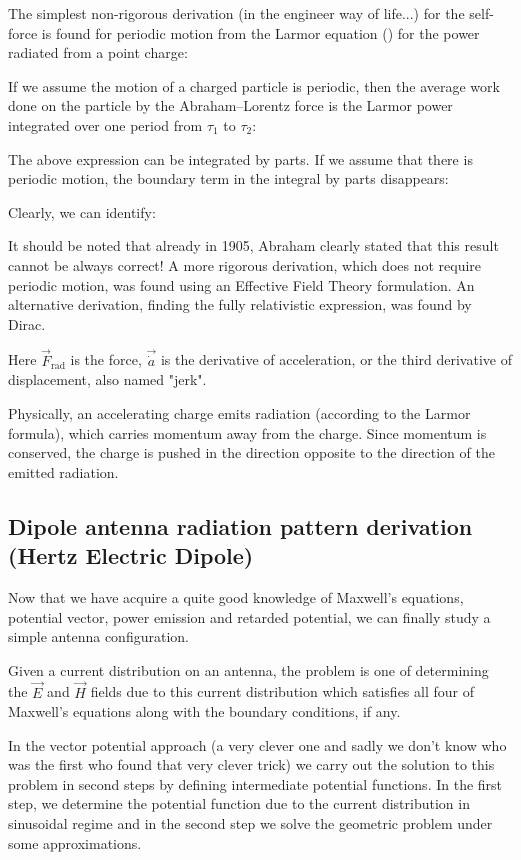 	The simplest non-rigorous derivation (in the engineer way of life...) for the self-force is found for periodic motion from the Larmor equation () for the power radiated from a point charge:
	
	If we assume the motion of a charged particle is periodic, then the average work done on the particle by the Abraham–Lorentz force is the  Larmor power integrated over one period from $\tau _{1}$ to $\tau _{2}$:
	
	The above expression can be integrated by parts. If we assume that there is periodic motion, the boundary term in the integral by parts disappears:
	
	Clearly, we can identify:
	
	It should be noted that already in 1905, Abraham clearly stated that this result cannot be always correct! A more rigorous derivation, which does not require periodic motion, was found using an Effective Field Theory formulation. An alternative derivation, finding the fully relativistic expression, was found by Dirac.
	
	Here $\vec{F}_\mathrm{rad}$ is the force, $\vec{\dot{a}}$ is the derivative of acceleration, or the third derivative of displacement, also named "jerk".
	
	Physically, an accelerating charge emits radiation (according to the Larmor formula), which carries momentum away from the charge. Since momentum is conserved, the charge is pushed in the direction opposite to the direction of the emitted radiation.
	
	\pagebreak
	\subsection{Dipole antenna radiation pattern derivation (Hertz Electric Dipole)}\label{Hertz diple}
	Now that we have acquire a quite good knowledge of Maxwell's equations, potential vector, power emission and retarded potential, we can finally study a simple antenna configuration.
	
	Given a current distribution on an antenna, the problem is one of determining the $\vec{E}$ and $\vec{H}$ fields due to this current distribution which satisfies all four of Maxwell’s equations along with the boundary conditions, if any. 
	
	In the vector potential approach (a very clever one and sadly we don't know who was the first who found that very clever trick) we carry out the solution to this problem in second steps by defining intermediate potential functions. In the first step, we determine the potential function due to the current distribution in sinusoidal regime and in the second step we solve the geometric problem under some approximations.
	
